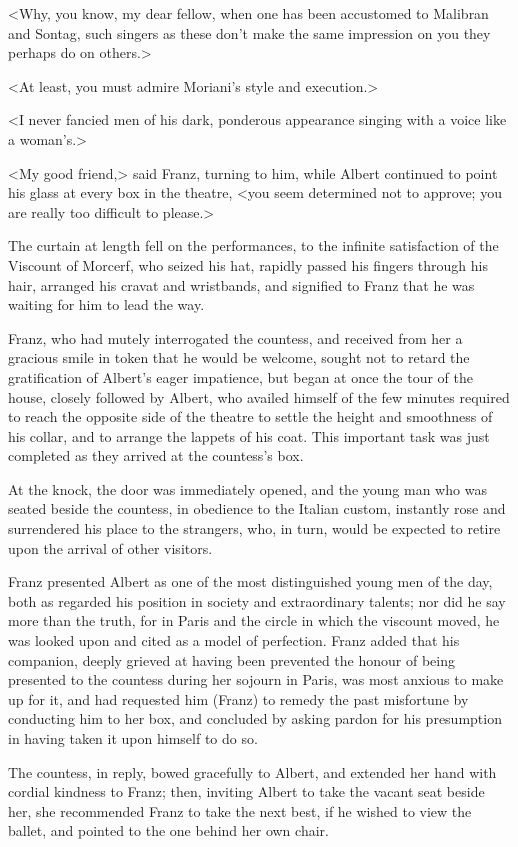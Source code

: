  <Why, you know, my dear fellow, when one has been accustomed to Malibran and Sontag, such singers as these don't make the same impression on you they perhaps do on others.> 

 <At least, you must admire Moriani's style and execution.> 

 <I never fancied men of his dark, ponderous appearance singing with a voice like a woman's.> 

 <My good friend,> said Franz, turning to him, while Albert continued to point his glass at every box in the theatre, <you seem determined not to approve; you are really too difficult to please.> 

 The curtain at length fell on the performances, to the infinite satisfaction of the Viscount of Morcerf, who seized his hat, rapidly passed his fingers through his hair, arranged his cravat and wristbands, and signified to Franz that he was waiting for him to lead the way. 

 Franz, who had mutely interrogated the countess, and received from her a gracious smile in token that he would be welcome, sought not to retard the gratification of Albert's eager impatience, but began at once the tour of the house, closely followed by Albert, who availed himself of the few minutes required to reach the opposite side of the theatre to settle the height and smoothness of his collar, and to arrange the lappets of his coat. This important task was just completed as they arrived at the countess's box. 

 At the knock, the door was immediately opened, and the young man who was seated beside the countess, in obedience to the Italian custom, instantly rose and surrendered his place to the strangers, who, in turn, would be expected to retire upon the arrival of other visitors. 

 Franz presented Albert as one of the most distinguished young men of the day, both as regarded his position in society and extraordinary talents; nor did he say more than the truth, for in Paris and the circle in which the viscount moved, he was looked upon and cited as a model of perfection. Franz added that his companion, deeply grieved at having been prevented the honour of being presented to the countess during her sojourn in Paris, was most anxious to make up for it, and had requested him (Franz) to remedy the past misfortune by conducting him to her box, and concluded by asking pardon for his presumption in having taken it upon himself to do so. 

 The countess, in reply, bowed gracefully to Albert, and extended her hand with cordial kindness to Franz; then, inviting Albert to take the vacant seat beside her, she recommended Franz to take the next best, if he wished to view the ballet, and pointed to the one behind her own chair. 

